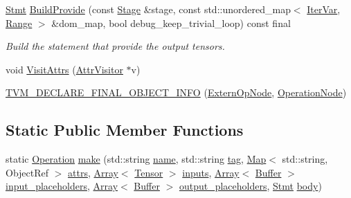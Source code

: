\begin{DoxyCompactItemize}
\hyperlink{classtvm_1_1tir_1_1Stmt}{Stmt} \hyperlink{classtvm_1_1te_1_1ExternOpNode_a57e5a0a6b3160e38209aa309e8535698}{Build\+Provide} (const \hyperlink{classtvm_1_1te_1_1Stage}{Stage} \&stage, const std\+::unordered\+\_\+map$<$ \hyperlink{classtvm_1_1tir_1_1IterVar}{Iter\+Var}, \hyperlink{classtvm_1_1Range}{Range} $>$ \&dom\+\_\+map, bool debug\+\_\+keep\+\_\+trivial\+\_\+loop) const final
\begin{DoxyCompactList}\small\item\em Build the statement that provide the output tensors. \end{DoxyCompactList}\item 
void \hyperlink{classtvm_1_1te_1_1ExternOpNode_ab36bb6d49424620d6e25cb71dc5b6a2a}{Visit\+Attrs} (\hyperlink{classtvm_1_1AttrVisitor}{Attr\+Visitor} $\ast$v)
\item 
\hyperlink{classtvm_1_1te_1_1ExternOpNode_a410ad593a7df5a0dd580f32e28bbd0d7}{T\+V\+M\+\_\+\+D\+E\+C\+L\+A\+R\+E\+\_\+\+F\+I\+N\+A\+L\+\_\+\+O\+B\+J\+E\+C\+T\+\_\+\+I\+N\+FO} (\hyperlink{classtvm_1_1te_1_1ExternOpNode}{Extern\+Op\+Node}, \hyperlink{classtvm_1_1te_1_1OperationNode}{Operation\+Node})
\end{DoxyCompactItemize}
\subsection*{Static Public Member Functions}
\begin{DoxyCompactItemize}
\item 
static \hyperlink{classtvm_1_1te_1_1Operation}{Operation} \hyperlink{classtvm_1_1te_1_1ExternOpNode_a598766b00a103d5fbbf1ee9599debdd0}{make} (std\+::string \hyperlink{classtvm_1_1te_1_1OperationNode_ad2fd6f140257f7b3c311f88374fa74d2}{name}, std\+::string \hyperlink{classtvm_1_1te_1_1OperationNode_ae6ac4336e7dc2df84f128fc97a6cdb9b}{tag}, \hyperlink{classtvm_1_1Map}{Map}$<$ std\+::string, Object\+Ref $>$ \hyperlink{classtvm_1_1te_1_1OperationNode_a009ebd67a59953ec9a587f9724afd538}{attrs}, \hyperlink{classtvm_1_1Array}{Array}$<$ \hyperlink{classtvm_1_1te_1_1Tensor}{Tensor} $>$ \hyperlink{classtvm_1_1te_1_1ExternOpNode_a12bd3ed18f9735abe6850766132eeb4c}{inputs}, \hyperlink{classtvm_1_1Array}{Array}$<$ \hyperlink{classtvm_1_1tir_1_1Buffer}{Buffer} $>$ \hyperlink{classtvm_1_1te_1_1ExternOpNode_ae5c3fa995ba59e0e001d6b8f92e39c7a}{input\+\_\+placeholders}, \hyperlink{classtvm_1_1Array}{Array}$<$ \hyperlink{classtvm_1_1tir_1_1Buffer}{Buffer} $>$ \hyperlink{classtvm_1_1te_1_1ExternOpNode_a004d2ec4a439339a2067e4fe7b93dac8}{output\+\_\+placeholders}, \hyperlink{classtvm_1_1tir_1_1Stmt}{Stmt} \hyperlink{classtvm_1_1te_1_1ExternOpNode_a962b2cfaa4a2141c1b9247ac634b7bf2}{body})
\end{DoxyCompactItemize}
